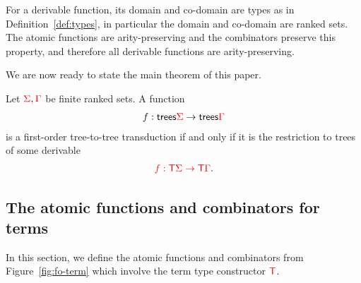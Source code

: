 For a derivable function, its domain and co-domain are types as in Definition~\ref{def:types}, in particular the domain and co-domain are ranked sets. The atomic functions are arity-preserving and the combinators preserve this property, and therefore all derivable functions are arity-preserving. 


We are now ready to state the main theorem of this paper. 

\begin{theorem}\label{thm:main}
    Let ${\color{red}{\Sigma}},{\color{red}{\Gamma}}$ be finite ranked sets. A function 
    \begin{align*}
        f : \mathsf {trees} {\color{red}{\Sigma}} \to \mathsf {trees} {\color{red}{\Gamma}}
    \end{align*}
    is a first-order tree-to-tree transduction if and only if it is the restriction to trees of some derivable
    \begin{align*}
        {\color{red}{f : {\color{red}{\mathsf T}}\Sigma \to {\color{red}{\mathsf T}}\Gamma}}.
    \end{align*}
    
\end{theorem}








\subsection{The atomic functions and combinators for terms}
\label{sec:atomic-and-combinators}
In this section, we define the atomic functions and combinators from Figure~\ref{fig:fo-term} which involve the term type constructor ${\color{red}{\mathsf T}}$. 





